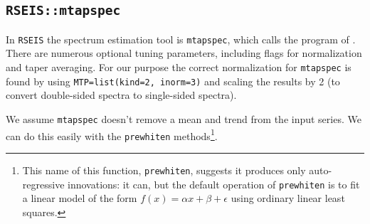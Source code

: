 \documentclass{article}\usepackage{graphicx, color}
\newcommand{\Rcmd}[1]{\texttt{#1}}
\begin{document}
\subsection{\Rcmd{RSEIS::mtapspec}}

In \Rcmd{RSEIS} the spectrum estimation tool is \Rcmd{mtapspec}, which
calls the program of \citet{lees1995}.
There are numerous optional tuning parameters, including
flags for
normalization and taper averaging.  
For our
purpose the correct normalization for \Rcmd{mtapspec} is found
by using
\Rcmd{MTP=list(kind=2, inorm=3)} and scaling the results by 2 (to convert
double-sided spectra to single-sided spectra).

We assume \Rcmd{mtapspec} doesn't remove a mean and trend from the
input series.  We can do this easily with the \Rcmd{prewhiten} methods\footnote{
This name of this function, \Rcmd{prewhiten},
suggests it produces only auto-regressive innovations:
it can, but the
default operation of  \Rcmd{prewhiten} is to fit a linear model of the form 
$f(x) = \alpha x + \beta + \epsilon$
using ordinary linear least squares.
}.
\end{document}
